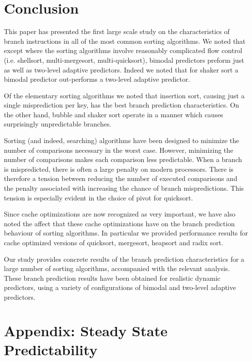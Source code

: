 \documentclass[acmtocl]{acmtrans2m}
\begin{document}
\section{Conclusion}

This paper has presented the first large scale study on the characteristics of branch instructions in 
all of the most common sorting algorithms. We noted that except where the sorting algorithms involve reasonably complicated
flow control (i.e. shellsort, multi-mergesort, multi-quicksort), bimodal predictors preform just as well as two-level adaptive predictors. Indeed we
noted that for shaker sort a bimodal predictor out-performs a two-level adaptive predictor.

Of the elementary sorting algorithms we noted that insertion sort,
causing just a single misprediction per key, has the best branch prediction characteristics. On the other hand,
bubble and shaker sort operate in a manner which causes surprisingly unpredictable branches.

Sorting (and indeed, searching) algorithms have been designed to minimize the number of comparisons necessary 
in the worst case. However, minimizing the number of comparisons makes each comparison less predictable. When a branch is
mispredicted, there is often a large penalty on modern processors. 
There is therefore a tension between reducing the number of executed comparisons and the penalty associated with 
increasing the chance of branch mispredictions. This tension is especially evident in the choice of pivot for quicksort.

Since cache optimizations are now recognized as very important, we 
have also noted the affect that these cache optimizations have on the branch prediction behaviour of sorting algorithms. In particular we
provided performance results for cache optimized versions of quicksort, mergesort, heapsort and radix sort.

Our study provides concrete results of the branch prediction characteristics for a large number
of sorting algorithms, accompanied with the relevant analysis.  These branch prediction results have been obtained for realistic dynamic predictors, using
a variety of configurations of bimodal and two-level adaptive predictors. 

\appendix

\section{Appendix: Steady State Predictability}
\label{appendix_SSP}
\end{document}
